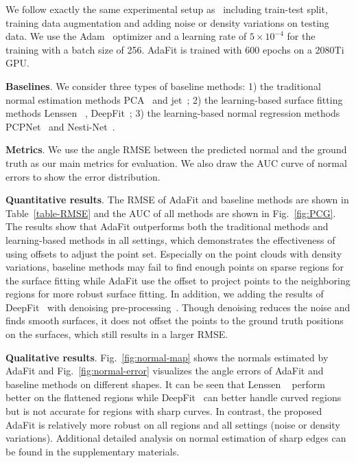 We follow exactly the same experimental setup as~\cite{guerrero2018pcpnet} including train-test split, training data augmentation and adding noise or density variations on testing data. 
We use the Adam~\cite{kingma2015adam} optimizer and a learning rate of $5 \times 10^{-4}$ for the training with a batch size of 256. AdaFit is trained with 600 epochs on a 2080Ti GPU.

\textbf{Baselines}. We consider three types of baseline methods: 1) the traditional normal estimation methods PCA~\cite{hoppe1992surface} and jet~\cite{cazals2005estimating}; 2) the learning-based surface fitting methods Lenssen \etal~\cite{lenssen2020deep}, DeepFit~\cite{ben2020deepfit}; 3) the learning-based normal regression methods PCPNet~\cite{guerrero2018pcpnet} and Nesti-Net~\cite{ben2019nesti}.

\textbf{Metrics}. We use the angle RMSE between the predicted normal and the ground truth as our main metrics for evaluation. We also draw the AUC curve of normal errors to show the error distribution.

\textbf{Quantitative results}. The RMSE of AdaFit and baseline methods are shown in Table~\ref{table-RMSE} and the AUC of all methods are shown in Fig.~\ref{fig:PCG}. The results show that AdaFit outperforms both the traditional methods and learning-based methods in all settings, which demonstrates the effectiveness of using offsets to adjust the point set. Especially on the point clouds with density variations, baseline methods may fail to find enough points on sparse regions for the surface fitting while AdaFit use the offset to project points to the neighboring regions for more robust surface fitting. In addition, we adding the results of DeepFit~\cite{ben2020deepfit} with denoising pre-processing~\cite{rakotosaona2020pointcleannet}. Though denoising reduces the noise and finds smooth surfaces, it does not offset the points to the ground truth positions on the surfaces, which still results in a larger RMSE.


\textbf{Qualitative results}. Fig.~\ref{fig:normal-map} shows the normals estimated by AdaFit and Fig.~\ref{fig:normal-error} visualizes the angle errors of AdaFit and baseline methods on different shapes. It can be seen that Lenssen \etal~\cite{lenssen2020deep} perform better on the flattened regions while DeepFit~\cite{ben2020deepfit} can better handle curved regions but is not accurate for regions with sharp curves. In contrast, the proposed AdaFit is relatively more robust on all regions and all settings (noise or density variations). Additional detailed analysis on normal estimation of sharp edges can be found in the supplementary materials.

